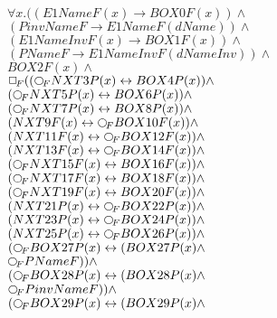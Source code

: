 \documentclass[a4paper,10pt]{article}
\begin{document}
 \newcommand{\nxt}{{\ensuremath\raisebox{0.25ex}{\text{\scriptsize$\bigcirc$}}}}
\newcommand{\Rdiamond}{\Diamond_{\!F}}
\newcommand{\Rbox}{\Box_{\!F}}
\newcommand{\Rnext}{\nxt_{\!F}}
\newcommand{\Ldiamond}{\Diamond_{\!P}}
\newcommand{\Lbox}{\Box_{\!P}}
\newcommand{\Lnext}{\nxt_{\!P}}
\newcommand{\SVdiamond}{\mathop{\ooalign{$\Diamond$ \cr \kern0.5ex
    \raisebox{0.35ex}{\scalebox{0.7}{$*$}}} \kern-0.9ex}}
\newcommand{\SVbox}{\mathop{\ooalign{$\Box$ \cr \kern0.42ex
    \raisebox{0.3ex}{\scalebox{0.7}{$*$}}} \kern-0.9ex}}


$ \forall x. ((E1NameF(x) \rightarrow BOX0F(x)) \land $ \\ 
 $ (PinvNameF \rightarrow E1NameF(dName)) \land $ \\ 
 $ (E1NameInvF(x) \rightarrow BOX1F(x)) \land $ \\ 
 $ (PNameF \rightarrow E1NameInvF(dNameInv)) \land $ \\ 
 $ BOX2F(x) \land $ \\ 
 $  \Rbox (( \Rnext NXT3P(x) \leftrightarrow BOX4P(x)) \land $ \\ 
 $ ( \Rnext NXT5P(x) \leftrightarrow BOX6P(x)) \land $ \\ 
 $ ( \Rnext NXT7P(x) \leftrightarrow BOX8P(x)) \land $ \\ 
 $ (NXT9F(x) \leftrightarrow  \Rnext BOX10F(x)) \land $ \\ 
 $ (NXT11F(x) \leftrightarrow  \Rnext BOX12F(x)) \land $ \\ 
 $ (NXT13F(x) \leftrightarrow  \Rnext BOX14F(x)) \land $ \\ 
 $ ( \Rnext NXT15F(x) \leftrightarrow BOX16F(x)) \land $ \\ 
 $ ( \Rnext NXT17F(x) \leftrightarrow BOX18F(x)) \land $ \\ 
 $ ( \Rnext NXT19F(x) \leftrightarrow BOX20F(x)) \land $ \\ 
 $ (NXT21P(x) \leftrightarrow  \Rnext BOX22P(x)) \land $ \\ 
 $ (NXT23P(x) \leftrightarrow  \Rnext BOX24P(x)) \land $ \\ 
 $ (NXT25P(x) \leftrightarrow  \Rnext BOX26P(x)) \land $ \\ 
 $ ( \Rnext BOX27P(x) \leftrightarrow (BOX27P(x) \land $ \\ 
 $  \Rnext PNameF)) \land $ \\ 
 $ ( \Rnext BOX28P(x) \leftrightarrow (BOX28P(x) \land $ \\ 
 $  \Rnext PinvNameF)) \land $ \\ 
 $ ( \Rnext BOX29P(x) \leftrightarrow (BOX29P(x) \land $ \\ 
\end{document}
